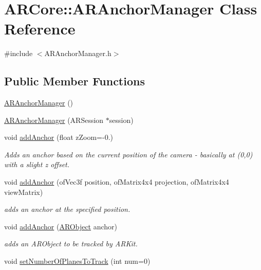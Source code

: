 \hypertarget{class_a_r_core_1_1_a_r_anchor_manager}{}\section{A\+R\+Core\+:\+:A\+R\+Anchor\+Manager Class Reference}
\label{class_a_r_core_1_1_a_r_anchor_manager}


{\ttfamily \#include $<$A\+R\+Anchor\+Manager.\+h$>$}

\subsection*{Public Member Functions}
\begin{DoxyCompactItemize}
\item 
\mbox{\hyperlink{class_a_r_core_1_1_a_r_anchor_manager_ad4f5727e58d9b4c6f582c50ba5ac0f49}{A\+R\+Anchor\+Manager}} ()
\item 
\mbox{\hyperlink{class_a_r_core_1_1_a_r_anchor_manager_a471dcdacaedea4647a04c34052742a61}{A\+R\+Anchor\+Manager}} (A\+R\+Session $\ast$session)
\item 
void \mbox{\hyperlink{class_a_r_core_1_1_a_r_anchor_manager_a462546bf84296188fd899d533a3c17bd}{add\+Anchor}} (float z\+Zoom=-\/0.)
\begin{DoxyCompactList}\small\item\em Adds an anchor based on the current position of the camera -\/ basically at (0,0) with a slight z offset. \end{DoxyCompactList}\item 
void \mbox{\hyperlink{class_a_r_core_1_1_a_r_anchor_manager_adcd398aa9ed15e22b7110fcbfa8bd929}{add\+Anchor}} (of\+Vec3f position, of\+Matrix4x4 projection, of\+Matrix4x4 view\+Matrix)
\begin{DoxyCompactList}\small\item\em adds an anchor at the specified position. \end{DoxyCompactList}\item 
void \mbox{\hyperlink{class_a_r_core_1_1_a_r_anchor_manager_ae710a985f06cfe488f218f49e8d0329a}{add\+Anchor}} (\mbox{\hyperlink{struct_a_r_objects_1_1_a_r_object}{A\+R\+Object}} anchor)
\begin{DoxyCompactList}\small\item\em adds an A\+R\+Object to be tracked by A\+R\+Kit. \end{DoxyCompactList}\item 
void \mbox{\hyperlink{class_a_r_core_1_1_a_r_anchor_manager_ab3ec0ff668e2adab3a0526ad79abd9f3}{set\+Number\+Of\+Planes\+To\+Track}} (int num=0)

\end{DoxyCompactItemize}
